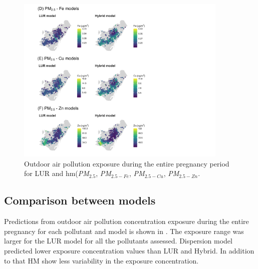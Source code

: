 \documentclass{article}
\begin{document}
\captionsetup[figure]{skip=6pt}
\begin{figure}[!htb]
\includegraphics[width=0.9\textwidth]{figures/combined_figure2.png}
\caption{Outdoor air pollution exposure during the entire pregnancy period for LUR and hm(\textit{PM$_{2.5}$}, \textit{PM$_{2.5-Fe}$}, \textit{PM$_{2.5-Cu}$}, \textit{PM$_{2.5-Zn}$}.}
\label{fig2b}
\end{figure}

\newpage
\subsection{Comparison between models} %
Predictions from outdoor air pollution concentration exposure during the entire pregnancy for each pollutant and model is shown in . The exposure range was larger for the LUR model for all the pollutants assessed. Dispersion model predicted lower exposure concentration values than LUR and Hybrid. In addition to that HM show less variability in the exposure concentration.
\end{document}
